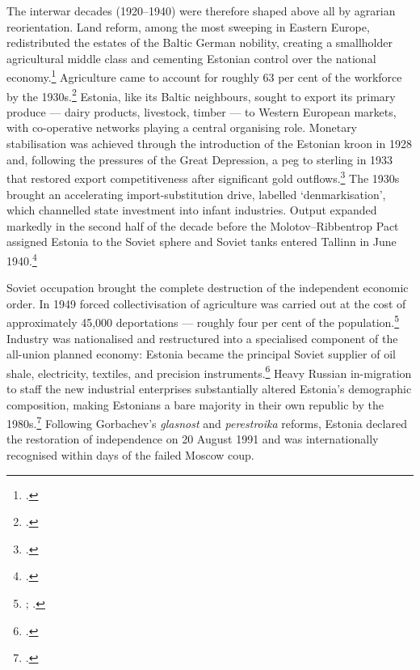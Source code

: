 \documentclass[12pt,a4paper]{article}
\begin{document}
The interwar decades (1920--1940) were therefore shaped above all by agrarian reorientation. Land reform, among the most sweeping in Eastern Europe, redistributed the estates of the Baltic German nobility, creating a smallholder agricultural middle class and cementing Estonian control over the national economy.\footnote{\autocite{norkus_denmarkisation}.} Agriculture came to account for roughly 63 per cent of the workforce by the 1930s.\footnote{\autocite[91]{biuletenis19393}.} Estonia, like its Baltic neighbours, sought to export its primary produce --- dairy products, livestock, timber --- to Western European markets, with co-operative networks playing a central organising role. Monetary stabilisation was achieved through the introduction of the Estonian kroon in 1928 and, following the pressures of the Great Depression, a peg to sterling in 1933 that restored export competitiveness after significant gold outflows.\footnote{\autocite[74]{bernankejames01}.} The 1930s brought an accelerating import-substitution drive, labelled `denmarkisation', which channelled state investment into infant industries. Output expanded markedly in the second half of the decade before the Molotov--Ribbentrop Pact assigned Estonia to the Soviet sphere and Soviet tanks entered Tallinn in June 1940.\footnote{\autocite{norkus_denmarkisation}.}

Soviet occupation brought the complete destruction of the independent economic order. In 1949 forced collectivisation of agriculture was carried out at the cost of approximately 45,000 deportations --- roughly four per cent of the population.\footnote{\autocite[265]{taagepera_coll01}; \autocite[12]{deportations_ee}.} Industry was nationalised and restructured into a specialised component of the all-union planned economy: Estonia became the principal Soviet supplier of oil shale, electricity, textiles, and precision instruments.\footnote{\autocite[158--217]{case_estonia}.} Heavy Russian in-migration to staff the new industrial enterprises substantially altered Estonia's demographic composition, making Estonians a bare majority in their own republic by the 1980s.\footnote{\autocite{case_estonia}.} Following Gorbachev's \textit{glasnost} and \textit{perestroika} reforms, Estonia declared the restoration of independence on 20 August 1991 and was internationally recognised within days of the failed Moscow coup.
\end{document}
